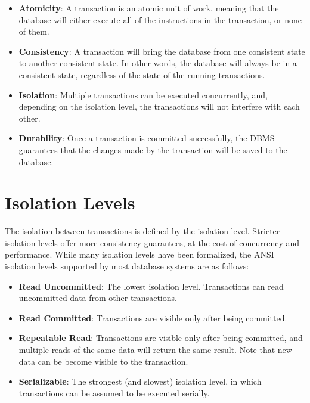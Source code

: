 \begin{itemize}
    \item \textbf{Atomicity}: A transaction is an atomic unit of work, meaning that the database will either execute all of the instructions in the transaction, or none of them.
    \item \textbf{Consistency}: A transaction will bring the database from one consistent state to another consistent state. In other words, the database will always be in a consistent state, regardless of the state of the running transactions.
    \item \textbf{Isolation}: Multiple transactions can be executed concurrently, and, depending on the isolation level, the transactions will not interfere with each other.
    \item \textbf{Durability}: Once a transaction is committed successfully, the DBMS guarantees that the changes made by the transaction will be saved to the database.
\end{itemize}


\section{Isolation Levels}

The isolation between transactions is defined by the isolation level. Stricter isolation levels offer more consistency guarantees, at the cost of concurrency and performance. While many isolation levels have been formalized, the ANSI isolation levels supported by most database systems \cite{melton1992iso_ANSI} are as follows:

\begin{itemize}
    \item \textbf{Read Uncommitted}: The lowest isolation level. Transactions can read uncommitted data from other transactions.
    \item \textbf{Read Committed}: Transactions are visible only after being committed.
    \item \textbf{Repeatable Read}: Transactions are visible only after being committed, and multiple reads of the same data will return the same result. Note that new data can be become visible to the transaction.
    \item \textbf{Serializable}: The strongest (and slowest) isolation level, in which transactions can be assumed to be executed serially.
\end{itemize}

